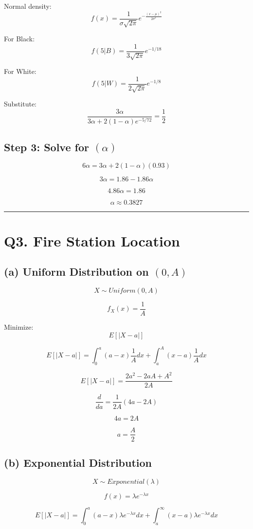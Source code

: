 \documentclass[12pt]{article}
\begin{document}
Normal density:
\[
f(x)=\frac{1}{\sigma\sqrt{2\pi}}
e^{-\frac{(x-\mu)^2}{2\sigma^2}}
\]

For Black:
\[
f(5|B)=\frac{1}{3\sqrt{2\pi}}e^{-1/18}
\]

For White:
\[
f(5|W)=\frac{1}{2\sqrt{2\pi}}e^{-1/8}
\]

Substitute:
\[
\frac{3\alpha}
{3\alpha+2(1-\alpha)e^{-5/72}}
=
\frac12
\]

\subsection*{Step 3: Solve for $(\alpha)$}

\[
6\alpha=3\alpha+2(1-\alpha)(0.93)
\]

\[
3\alpha=1.86-1.86\alpha
\]

\[
4.86\alpha=1.86
\]

\[
\alpha \approx 0.3827
\]

\hrule
\vspace{1em}

\section*{Q3. Fire Station Location}

\subsection*{(a) Uniform Distribution on $(0,A)$}

\[
X\sim Uniform(0,A)
\]

\[
f_X(x)=\frac1A
\]

Minimize:
\[
E[|X-a|]
\]

\[
E[|X-a|]
=
\int_0^a (a-x)\frac1A dx
+
\int_a^A (x-a)\frac1A dx
\]

\[
E[|X-a|]
=
\frac{2a^2-2aA+A^2}{2A}
\]

\[
\frac{d}{da}
=
\frac1{2A}(4a-2A)
\]

\[
4a=2A
\]

\[
a=\frac A2
\]

\subsection*{(b) Exponential Distribution}

\[
X\sim Exponential(\lambda)
\]

\[
f(x)=\lambda e^{-\lambda x}
\]

\[
E[|X-a|]
=
\int_0^a (a-x)\lambda e^{-\lambda x}dx
+
\int_a^\infty (x-a)\lambda e^{-\lambda x}dx
\]
\end{document}
